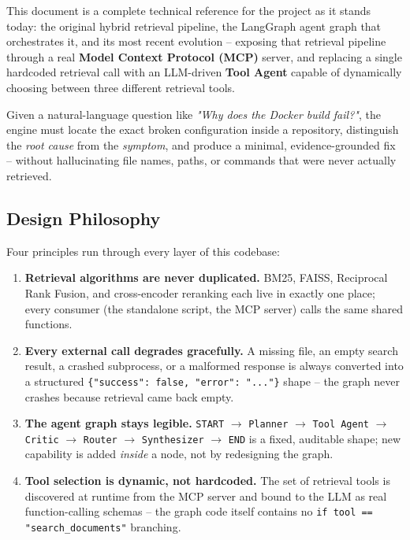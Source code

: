 \documentclass[11pt,a4paper]{article}
\begin{document}
This document is a complete technical reference for the project as it stands
today: the original hybrid retrieval pipeline, the LangGraph agent graph that
orchestrates it, and its most recent evolution -- exposing that retrieval
pipeline through a real \textbf{Model Context Protocol (MCP)} server, and
replacing a single hardcoded retrieval call with an LLM-driven
\textbf{Tool Agent} capable of dynamically choosing between three different
retrieval tools.

\begin{infobox}
Given a natural-language question like \textit{"Why does the Docker build
fail?"}, the engine must locate the exact broken configuration inside a
repository, distinguish the \emph{root cause} from the \emph{symptom}, and
produce a minimal, evidence-grounded fix -- without hallucinating file names,
paths, or commands that were never actually retrieved.
\end{infobox}

\subsection{Design Philosophy}

Four principles run through every layer of this codebase:

\begin{enumerate}
\item \textbf{Retrieval algorithms are never duplicated.} BM25, FAISS,
      Reciprocal Rank Fusion, and cross-encoder reranking each live in
      exactly one place; every consumer (the standalone script, the MCP
      server) calls the same shared functions.
\item \textbf{Every external call degrades gracefully.} A missing file, an
      empty search result, a crashed subprocess, or a malformed response
      is always converted into a structured
      \texttt{\{"success": false, "error": "..."\}} shape -- the graph
      never crashes because retrieval came back empty.
\item \textbf{The agent graph stays legible.} \texttt{START} $\rightarrow$
      \texttt{Planner} $\rightarrow$ \texttt{Tool Agent} $\rightarrow$
      \texttt{Critic} $\rightarrow$ \texttt{Router} $\rightarrow$
      \texttt{Synthesizer} $\rightarrow$ \texttt{END} is a fixed, auditable
      shape; new capability is added \emph{inside} a node, not by
      redesigning the graph.
\item \textbf{Tool selection is dynamic, not hardcoded.} The set of
      retrieval tools is discovered at runtime from the MCP server and
      bound to the LLM as real function-calling schemas -- the graph code
      itself contains no \texttt{if tool == "search\_documents"} branching.
\end{enumerate}
\end{document}
